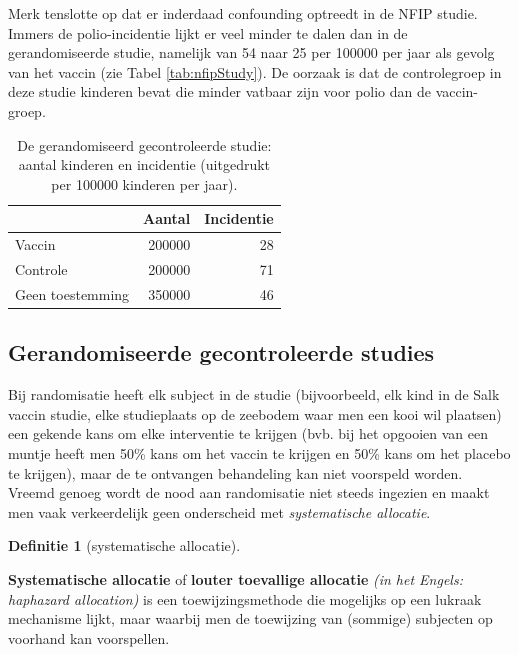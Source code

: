 \documentclass[
  12pt,dutch]{book}
\theoremstyle{definition}
\newtheorem{definition}{Definitie}[chapter]
\theoremstyle{definition}
\theoremstyle{definition}
\theoremstyle{definition}
\theoremstyle{remark}
\begin{document}
Merk tenslotte op dat er inderdaad confounding optreedt in de NFIP studie. Immers
de polio-incidentie lijkt er veel minder te dalen dan in de gerandomiseerde studie, namelijk van 54 naar 25
per 100000 per jaar als gevolg van het vaccin (zie Tabel \ref{tab:nfipStudy}). De oorzaak is dat
de controlegroep in deze studie kinderen bevat die minder vatbaar zijn voor
polio dan de vaccin-groep.

\begin{table}

\caption{\label{tab:dbrcStudy}De gerandomiseerd gecontroleerde studie: aantal kinderen en incidentie (uitgedrukt per
100000 kinderen per jaar).}
\centering
\begin{tabular}[t]{lrr}
\toprule
  & Aantal & Incidentie\\
\midrule
Vaccin & 200000 & 28\\
Controle & 200000 & 71\\
Geen toestemming & 350000 & 46\\
\bottomrule
\end{tabular}
\end{table}

\subsection{Gerandomiseerde gecontroleerde studies}\label{gerandomiseerde-gecontroleerde-studies}

Bij randomisatie heeft elk subject in de studie (bijvoorbeeld, elk kind in de Salk vaccin studie, elke studieplaats op de zeebodem waar men een kooi wil plaatsen) een gekende kans om elke interventie te krijgen (bvb. bij het opgooien van een muntje heeft men 50\% kans om het
vaccin te krijgen en 50\% kans om het placebo te krijgen), maar de te
ontvangen behandeling kan niet voorspeld worden. Vreemd genoeg wordt de nood
aan randomisatie niet steeds ingezien en maakt men vaak verkeerdelijk geen
onderscheid met \emph{systematische allocatie}.

\begin{definition}[systematische allocatie]
\protect\hypertarget{def:unnamed-chunk-70}{}\label{def:unnamed-chunk-70}~
\end{definition}

\textbf{Systematische allocatie} of \textbf{louter toevallige allocatie}
\emph{(in het Engels: haphazard allocation)} is een toewijzingsmethode die
mogelijks op een lukraak mechanisme lijkt, maar waarbij men de toewijzing
van (sommige) subjecten op voorhand kan voorspellen.
\end{document}
